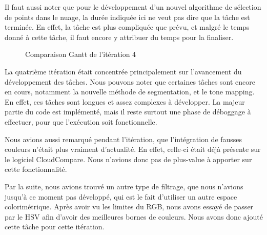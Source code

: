 \documentclass[12pt,titlepage,french]{article}
\begin{document}
Il faut aussi noter que pour le développement d'un nouvel algorithme de sélection de points dans le nuage, la durée indiquée ici ne veut pas dire que la tâche est terminée. En effet, la tâche est plus compliquée que prévu, et malgré le temps donné à cette tâche, il faut encore y attribuer du temps pour la finaliser.

\begin{figure}[H]
    \caption{\label{} Comparaison Gantt de l'itération 4}
\end{figure}

La quatrième itération était concentrée principalement sur l'avancement du développement des tâches. Nous pouvons noter que certaines tâches sont encore en cours, notamment la nouvelle méthode de segmentation, et le tone mapping. En effet, ces tâches sont longues et assez complexes à développer. La majeur partie du code est implémenté, mais il reste surtout une phase de déboggage à effectuer, pour que l'exécution soit fonctionnelle. \newline

Nous avions aussi remarqué pendant l'itération, que l'intégration de fausses couleurs n'était plus vraiment d'actualité. En effet, celle-ci était déjà présente sur le logiciel CloudCompare. Nous n'avions donc pas de plus-value à apporter sur cette fonctionnalité. \newline

Par la suite, nous avions trouvé un autre type de filtrage, que nous n'avions jusqu'à ce moment pas développé, qui est le fait d'utiliser un autre espace colorimétrique. Après avoir vu les limites du RGB, nous avons essayé de passer par le HSV afin d'avoir des meilleures bornes de couleurs. Nous avons donc ajouté cette tâche pour cette itération.
\end{document}
